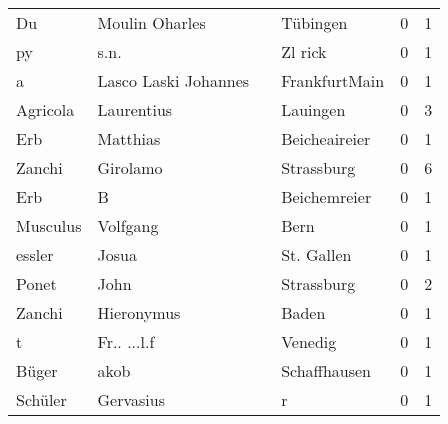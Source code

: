\begin{tabular}{llllrr}
                       Du &                     Moulin Oharles &             &                                    Tübingen &          0 &         1 \\
                       py &                               s.n. &             &                                     Zl rick &          0 &         1 \\
                        a &               Lasco Laski Johannes &             &                               FrankfurtMain &          0 &         1 \\
                 Agricola &                         Laurentius &             &                                    Lauingen &          0 &         3 \\
                      Erb &                           Matthias &             &                               Beicheaireier &          0 &         1 \\
                   Zanchi &                           Girolamo &             &                                  Strassburg &          0 &         6 \\
                      Erb &                                  B &             &                                Beichemreier &          0 &         1 \\
                 Musculus &                           Volfgang &             &                                        Bern &          0 &         1 \\
                   essler &                              Josua &             &                                  St. Gallen &          0 &         1 \\
                    Ponet &                               John &             &                                  Strassburg &          0 &         2 \\
                   Zanchi &                         Hieronymus &             &                                       Baden &          0 &         1 \\
                        t &                        Fr.. ...l.f &             &                                     Venedig &          0 &         1 \\
                    Büger &                               akob &             &                                Schaffhausen &          0 &         1 \\
                  Schüler &                          Gervasius &             &                                           r &          0 &         1 \\

\end{tabular}
